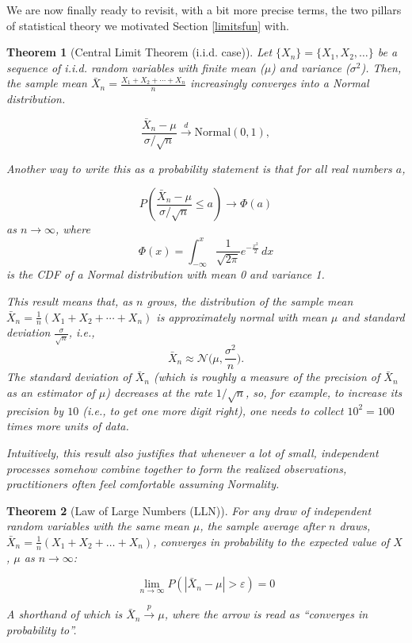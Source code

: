 \documentclass[
]{book}
\newtheorem{theorem}{Theorem}[chapter]
\theoremstyle{definition}
\theoremstyle{definition}
\theoremstyle{definition}
\theoremstyle{remark}
\begin{document}
We are now finally ready to revisit, with a bit more precise terms, the two pillars of statistical theory we motivated Section \ref{limitsfun} with.

\begin{theorem}[Central Limit Theorem (i.i.d. case)]
\protect\hypertarget{thm:clt}{}{\label{thm:clt} {} }Let \(\{X_n\} = \{X_1, X_2, \ldots\}\) be a sequence of i.i.d. random variables with finite mean (\(\mu\)) and variance (\(\sigma^2\)). Then, the sample mean \(\bar{X}_n = \frac{X_1 + X_2 + \cdots + X_n}{n}\) increasingly converges into a Normal distribution.

\[\frac{\bar{X}_n - \mu}{\sigma / \sqrt{n}} \xrightarrow{d} \text{Normal}(0, 1),\]

Another way to write this as a probability statement is that for all real numbers \(a\),

\[P\left(\frac{\bar{X}_n - \mu}{\sigma/\sqrt{n}} \le a\right) \rightarrow \Phi(a)\]
as \(n\to \infty\), where \[\Phi(x) = \int_{-\infty}^x \frac{1}{\sqrt{2\pi}}e^{-\frac{x^2}{2}} \, dx\] is the CDF of a Normal distribution with mean 0 and variance 1.

This result means that, as \(n\) grows, the distribution of the sample mean \(\bar X_n = \frac{1}{n} (X_1 + X_2 + \cdots + X_n)\) is approximately normal with mean \(\mu\) and standard deviation \(\frac{\sigma}{\sqrt n}\), i.e.,
\[\bar{X}_n \approx \mathcal{N}\bigg(\mu, \frac{\sigma^2}{n}\bigg).\] The standard deviation of \(\bar X_n\) (which is roughly a measure of the precision of \(\bar X_n\) as an estimator of \(\mu\)) decreases at the rate \(1/\sqrt{n}\), so, for example, to increase its precision by \(10\) (i.e., to get one more digit right), one needs to collect \(10^2=100\) times more units of data.

Intuitively, this result also justifies that whenever a lot of small, independent processes somehow combine together to form the realized observations, practitioners often feel comfortable assuming Normality.
\end{theorem}

\begin{theorem}[Law of Large Numbers (LLN)]
\protect\hypertarget{thm:lln}{}{\label{thm:lln} {} }For any draw of independent random variables with the same mean \(\mu\), the sample average after \(n\) draws, \(\bar{X}_n = \frac{1}{n}(X_1 + X_2 + \ldots + X_n)\), converges in probability to the expected value of \(X\), \(\mu\) as \(n \rightarrow \infty\):

\[\lim\limits_{n\to \infty} P(|\bar{X}_n - \mu | > \varepsilon) = 0\]

A shorthand of which is \(\bar{X}_n \xrightarrow{p} \mu\), where the arrow is read as ``converges in probability to''.
\end{theorem}
\end{document}

